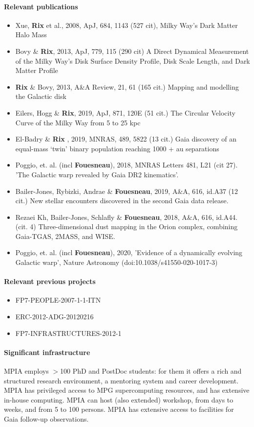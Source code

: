 \paragraph{Relevant publications}
\begin{itemize}
    \item Xue, \textbf{Rix} et al., 2008, ApJ, 684, 1143 (527 cit), Milky Way's Dark Matter Halo Mass
    \item Bovy \& \textbf{Rix}, 2013, ApJ, 779, 115 (290 cit) A Direct Dynamical Measurement of the Milky Way's Disk Surface Density Profile, Disk Scale Length, and Dark Matter Profile 
    \item \textbf{Rix} \& Bovy, 2013, A\&A Review, 21, 61 (165 cit.) Mapping and modelling the Galactic disk
    \item Eilers, Hogg \& \textbf{Rix}, 2019, ApJ, 871, 120E (51 cit.) The Circular Velocity Curve of the Milky Way from 5 to 25 kpc
    \item El-Badry \& \textbf{Rix} , 2019, MNRAS, 489, 5822 (13 cit.) Gaia discovery of an equal-mass `twin' binary population reaching 1000 + au separations
    \item Poggio, et. al. (incl \textbf{Fouesneau}), 2018, MNRAS Letters 481, L21 (cit 27). 'The Galactic warp revealed by Gaia DR2 kinematics'. 
    \item {{Bailer-Jones}, {Rybizki}, {Andrae} \&
         \textbf{Fouesneau}}, 2019, A\&A, 616, id.A37 (12 cit.) {New stellar encounters discovered in the second Gaia data release}.
    \item {Rezaei Kh, Bailer-Jones, Schlafly \& \textbf{Fouesneau}}, 2018, A\&A, 616, id.A44. (cit. 4) Three-dimensional dust mapping in the Orion complex, combining Gaia-TGAS, 2MASS, and WISE.
    \item Poggio, et. al. (incl \textbf{Fouesneau}), 2020, 'Evidence of a dynamically evolving Galactic warp', Nature Astronomy (doi:10.1038/s41550-020-1017-3)
    
\end{itemize}

\paragraph{Relevant previous projects}
\begin{itemize}
    \item FP7-PEOPLE-2007-1-1-ITN
    \item ERC-2012-ADG-20120216
    \item FP7-INFRASTRUCTURES-2012-1
\end{itemize}

\paragraph{Significant infrastructure}
MPIA employs $>$100 PhD and PostDoc students: for them it offers a rich and structured research environment, a mentoring system and career development. MPIA has privileged access to MPG supercomputing resources, and has extensive in-house computing. MPIA can host (also extended) workshop, from days to weeks, and from 5 to 100 persons. MPIA has extensive access to facilities for Gaia follow-up observations.